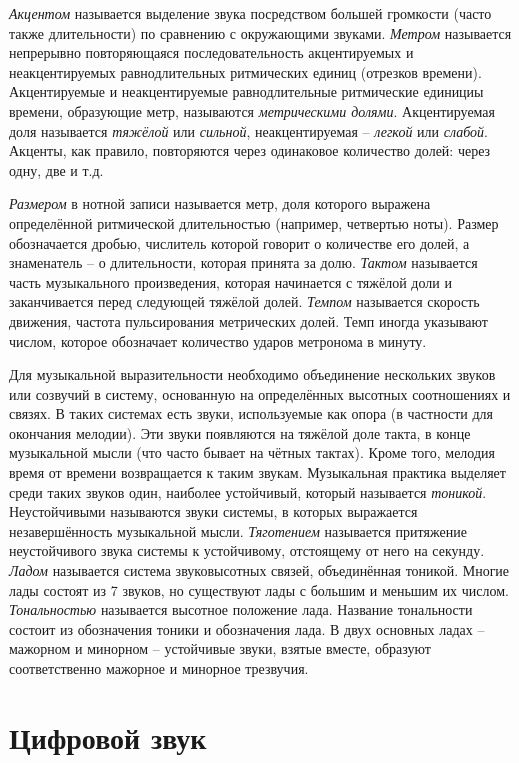 \emph{Акцентом} называется выделение звука посредством большей громкости (часто
также длительности) по сравнению с окружающими звуками. \emph{Метром} называется
непрерывно повторяющаяся последовательность акцентируемых и неакцентируемых
равнодлительных ритмических единиц (отрезков времени). Акцентируемые и
неакцентируемые равнодлительные ритмические единициы времени, образующие метр,
называются \emph{метрическими долями}. Акцентируемая доля называется
\emph{тяжёлой} или \emph{сильной}, неакцентируемая -- \emph{легкой} или
\emph{слабой}. Акценты, как правило, повторяются через одинаковое количество
долей: через одну, две и т.д.

\emph{Размером} в нотной записи называется метр, доля которого выражена
определённой ритмической длительностью (например, четвертью ноты). Размер
обозначается дробью, числитель которой говорит о количестве его долей, а
знаменатель -- о длительности, которая принята за долю. \emph{Тактом} называется
часть музыкального произведения, которая начинается с тяжёлой доли и
заканчивается перед следующей тяжёлой долей. \emph{Темпом} называется скорость
движения, частота пульсирования метрических долей. Темп иногда указывают числом,
которое обозначает количество ударов метронома в минуту.

Для музыкальной выразительности необходимо объединение нескольких звуков или
созвучий в систему, основанную на определённых высотных соотношениях и связях. В
таких системах есть звуки, используемые как опора (в частности для окончания
мелодии). Эти звуки появляются на тяжёлой доле такта, в конце музыкальной мысли
(что часто бывает на чётных тактах). Кроме того, мелодия время от времени
возвращается к таким звукам. Музыкальная практика выделяет среди таких звуков
один, наиболее устойчивый, который называется \emph{тоникой}. Неустойчивыми
называются звуки системы, в которых выражается незавершённость музыкальной
мысли. \emph{Тяготением} называется притяжение неустойчивого звука системы к
устойчивому, отстоящему от него на секунду. \emph{Ладом} называется система
звуковысотных связей, объединённая тоникой. Многие лады состоят из 7 звуков, но
существуют лады с большим и меньшим их числом. \emph{Тональностью} называется
высотное положение лада. Название тональности состоит из обозначения тоники и
обозначения лада. В двух основных ладах -- мажорном и минорном -- устойчивые
звуки, взятые вместе, образуют соответственно мажорное и минорное трезвучия.

\section{Цифровой звук} \label{sectT_digit}

